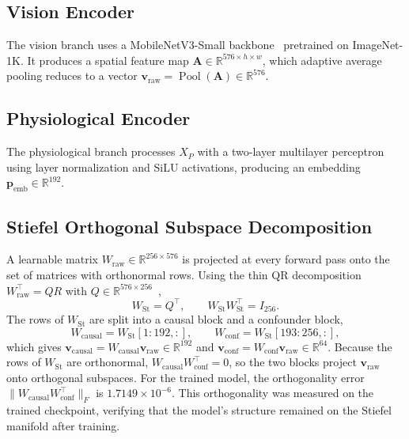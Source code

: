 \subsection{Vision Encoder}
The vision branch uses a MobileNetV3-Small backbone~\cite{howard2019} pretrained on ImageNet-1K. It produces a spatial feature map $\mathbf{A} \in \mathbb{R}^{576 \times h \times w}$, which adaptive average pooling reduces to a vector $\mathbf{v}_{\text{raw}} = \operatorname{Pool}(\mathbf{A}) \in \mathbb{R}^{576}$.

\subsection{Physiological Encoder}
The physiological branch processes $X_P$ with a two-layer multilayer perceptron using layer normalization and SiLU activations, producing an embedding $\mathbf{p}_{\text{emb}} \in \mathbb{R}^{192}$.

\subsection{Stiefel Orthogonal Subspace Decomposition}
A learnable matrix $W_{\text{raw}} \in \mathbb{R}^{256 \times 576}$ is projected at every forward pass onto the set of matrices with orthonormal rows. Using the thin QR decomposition $W_{\text{raw}}^{\top} = QR$ with $Q \in \mathbb{R}^{576 \times 256}$~\cite{edelman1998},
\begin{equation}
W_{\text{St}} = Q^{\top}, \qquad W_{\text{St}} W_{\text{St}}^{\top} = I_{256}.
\end{equation}
The rows of $W_{\text{St}}$ are split into a causal block and a confounder block,
\begin{equation}
W_{\text{causal}} = W_{\text{St}}[1{:}192, :], \qquad W_{\text{conf}} = W_{\text{St}}[193{:}256, :],
\end{equation}
which gives $\mathbf{v}_{\text{causal}} = W_{\text{causal}}\mathbf{v}_{\text{raw}} \in \mathbb{R}^{192}$ and $\mathbf{v}_{\text{conf}} = W_{\text{conf}}\mathbf{v}_{\text{raw}} \in \mathbb{R}^{64}$. Because the rows of $W_{\text{St}}$ are orthonormal, $W_{\text{causal}} W_{\text{conf}}^{\top} = 0$, so the two blocks project $\mathbf{v}_{\text{raw}}$ onto orthogonal subspaces. For the trained model, the orthogonality error $\|W_{\text{causal}} W_{\text{conf}}^{\top}\|_F$ is $1.7149 \times 10^{-6}$.
This orthogonality was measured on the trained checkpoint, verifying that the model's structure remained on the Stiefel manifold after training.

